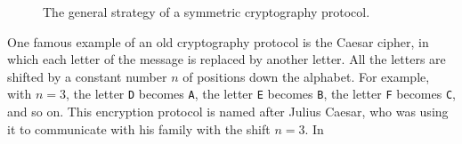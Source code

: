 \begin{figure}[h]
  \centering
  \caption{The general strategy of a symmetric cryptography protocol.}
  \label{fig:crypto-sym}
\end{figure}
One famous example of an old cryptography protocol is the Caesar cipher, in
which each letter of the message is replaced by another letter. All the letters
are shifted by a constant number $n$ of positions down the alphabet. For
example, with $n=3$, the letter \texttt{D} becomes \texttt{A}, the letter
\texttt{E} becomes \texttt{B}, the letter \texttt{F} becomes \texttt{C}, and so
on. This encryption protocol is named after Julius Caesar,
who was using it to communicate with his family with the shift $n=3$. In
